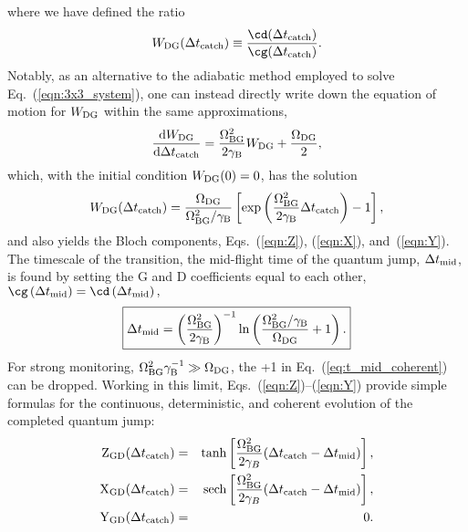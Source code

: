 where we have defined the ratio \citep{Porrati1987}
\begin{equation}
W_{{\rm DG}}(\Delta t_{{\rm catch}})\equiv\frac{\cd(\Delta t_{{\rm catch}})}{\cg(\Delta t_{{\rm catch}})}.\label{eqn:W_DG_definition}
\end{equation}
Notably, as an alternative to the adiabatic method employed to solve
Eq.~(\ref{eqn:3x3_system}), one can instead directly write down
the equation of motion for $W_{{\rm DG}}$ within the same approximations,
\begin{equation}
\frac{\mathrm{d}W_{{\rm DG}}}{\mathrm{d}\Delta t_{{\rm catch}}}=\frac{\Omega_{{\rm BG}}^{2}}{2\gamma_{{\rm B}}}W_{{\rm DG}}+\frac{\Omega_{{\rm DG}}}{2},\label{eqn:W_DG_equation_coherent}
\end{equation}
which, with the initial condition $W_{{\rm DG}}(0)=0$, has the solution
\begin{equation}
W_{{\rm DG}}(\Delta t_{{\rm catch}})=\frac{\Omega_{{\rm DG}}}{\Omega_{{\rm BG}}^{2}/\gamma_{{\rm B}}}\left[\exp\left(\frac{\Omega_{{\rm BG}}^{2}}{2\gamma_{{\rm B}}}\Delta t_{{\rm catch}}\right)-1\right],\label{eq:WDG-coh}
\end{equation}
and also yields the Bloch components, Eqs.~(\ref{eqn:Z}), (\ref{eqn:X}),
and~(\ref{eqn:Y}). The timescale of the transition, the mid-flight
time of the quantum jump, $\Delta t_{{\rm mid}}$, is found by setting
the G and D coefficients equal to each other, $\cg\left(\Delta t_{{\rm mid}}\right)=\cd\left(\Delta t_{{\rm mid}}\right),$
\begin{equation}
\boxed{\Delta t_{{\rm mid}}=\left(\frac{\Omega_{{\rm BG}}^{2}}{2\gamma_{{\rm B}}}\right)^{-1}\ln\left(\frac{\Omega_{{\rm BG}}^{2}/\gamma_{{\rm B}}}{\Omega_{{\rm DG}}}+1\right).}\label{eq:t_mid_coherent}
\end{equation}
For strong monitoring, $\Omega_{{\rm BG}}^{2}\gamma_{{\rm B}}^{-1}\gg\Omega_{{\rm DG}}$,
the +1 in Eq.~(\ref{eq:t_mid_coherent}) can be dropped. Working
in this limit, Eqs.~(\ref{eqn:Z})–(\ref{eqn:Y}) provide simple
formulas for the continuous, deterministic, and coherent evolution
of the completed quantum jump:
\begin{eqnarray}
{\rm Z}_{{\rm GD}}(\Delta t_{{\rm catch}}) & = & {\rm tanh}\left[\frac{\Omega_{{\rm BG}}^{2}}{2\gamma_{B}}(\Delta t_{{\rm catch}}-\Delta t_{{\rm mid}})\right],\label{eqn:Z_approx}\\
{\rm X}_{{\rm GD}}(\Delta t_{{\rm catch}}) & = & {\rm sech}\left[\frac{\Omega_{{\rm BG}}^{2}}{2\gamma_{B}}(\Delta t_{{\rm catch}}-\Delta t_{{\rm mid}})\right],\label{eqn:X_approx}\\
{\rm Y}_{{\rm GD}}(\Delta t_{{\rm catch}}) & = & 0.\label{eqn:Y_approx}
\end{eqnarray}
